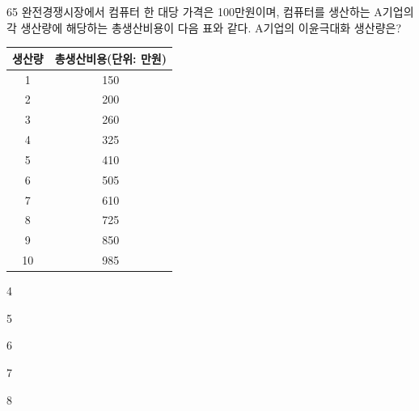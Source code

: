 \begin{question}{65}
완전경쟁시장에서 컴퓨터 한 대당 가격은 100만원이며, 컴퓨터를 생산하는 A기업의 각 생산량에 해당하는 총생산비용이 다음 표와 같다. A기업의 이윤극대화 생산량은?

{\small\centering
\begin{tabular}{|c|c|}
\hline
생산량 & 총생산비용(단위: 만원) \\
\hline
1 & 150 \\ 2 & 200 \\ 3 & 260 \\ 4 & 325 \\ 5 & 410 \\
6 & 505 \\ 7 & 610 \\ 8 & 725 \\ 9 & 850 \\ 10 & 985 \\
\hline
\end{tabular}\par}

\begin{choices}
  \item 4
  \item 5
  \item 6
  \item 7
  \item 8
\end{choices}
\end{question}
